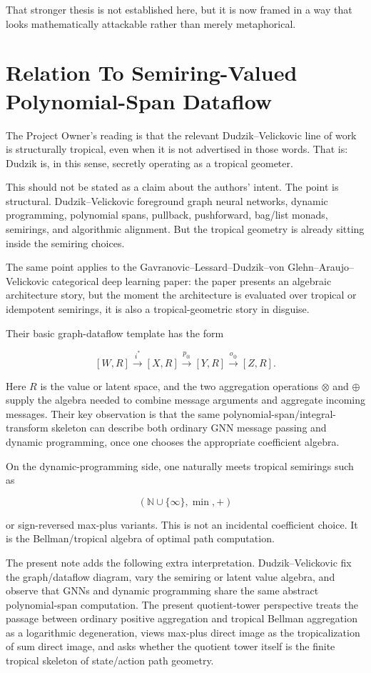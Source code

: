 \documentclass[11pt]{article}
\begin{document}
That stronger thesis is not established here, but it is now framed in a way
that looks mathematically attackable rather than merely metaphorical.

\section{Relation To Semiring-Valued Polynomial-Span Dataflow}

The Project Owner's reading is that the relevant Dudzik--Velickovic line of
work is structurally tropical, even when it is not advertised in those words.
That is: Dudzik is, in this sense, secretly operating as a tropical geometer.

This should not be stated as a claim about the authors' intent. The point is
structural. Dudzik--Velickovic foreground graph neural networks, dynamic
programming, polynomial spans, pullback, pushforward, bag/list monads,
semirings, and algorithmic alignment. But the tropical geometry is already
sitting inside the semiring choices.

The same point applies to the Gavranovic--Lessard--Dudzik--von Glehn--Araujo--
Velickovic categorical deep learning paper: the paper presents an algebraic
architecture story, but the moment the architecture is evaluated over tropical
or idempotent semirings, it is also a tropical-geometric story in disguise.

Their basic graph-dataflow template has the form

\[
[W,R]
\xrightarrow{i^*}
[X,R]
\xrightarrow{p_\otimes}
[Y,R]
\xrightarrow{o_\oplus}
[Z,R].
\]

Here \(R\) is the value or latent space, and the two aggregation operations
\(\otimes\) and \(\oplus\) supply the algebra needed to combine message
arguments and aggregate incoming messages. Their key observation is that the
same polynomial-span/integral-transform skeleton can describe both ordinary
GNN message passing and dynamic programming, once one chooses the appropriate
coefficient algebra.

On the dynamic-programming side, one naturally meets tropical semirings such as

\[
(\mathbb N\cup\{\infty\},\min,+)
\]

or sign-reversed max-plus variants. This is not an incidental coefficient
choice. It is the Bellman/tropical algebra of optimal path computation.

The present note adds the following extra interpretation. Dudzik--Velickovic
fix the graph/dataflow diagram, vary the semiring or latent value algebra, and
observe that GNNs and dynamic programming share the same abstract
polynomial-span computation. The present quotient-tower perspective treats the
passage between ordinary positive aggregation and tropical Bellman aggregation
as a logarithmic degeneration, views max-plus direct image as the
tropicalization of sum direct image, and asks whether the quotient tower itself
is the finite tropical skeleton of state/action path geometry.
\end{document}
